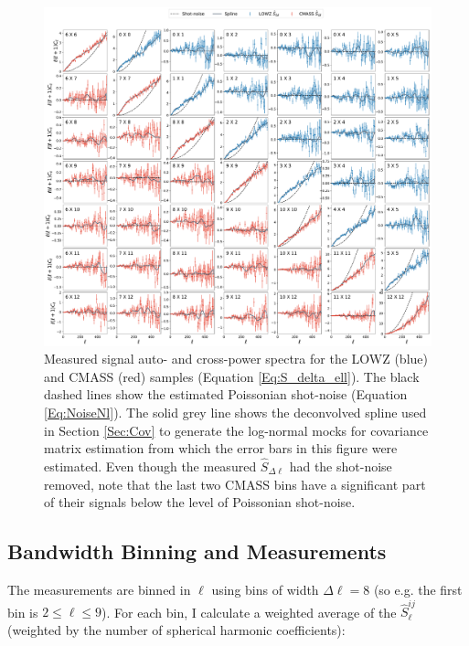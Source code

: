 \begin{figure}
\begin{center}
\includegraphics[width=1.0\textwidth]{BOSS-FIGS/PCL-data_red3.pdf}
\caption[Measured angular power spectra from the BOSS samples.]{Measured signal auto- and cross-power spectra for the LOWZ (blue) and CMASS (red) samples (Equation \ref{Eq:S_delta_ell}). The black dashed lines show the estimated Poissonian shot-noise (Equation \ref{Eq:NoiseNl}). The solid grey line shows the deconvolved spline used in Section \ref{Sec:Cov} to generate the log-normal mocks for covariance matrix estimation from which the error bars in this figure were estimated. Even though the measured $\hat{S}_{\Delta\ell}$ had the shot-noise removed, note that the last two CMASS bins have a significant part of their signals below the level of Poissonian shot-noise.}
\label{fig:PCLs}
\end{center}
\end{figure}

\subsection{Bandwidth Binning and Measurements}

The measurements are binned in $\ell$ using bins of width $\Delta\ell = 8$ (so e.g. the first bin is $2 \leq \ell \leq 9$). For each bin, I calculate a weighted average of the $\hat{S}_{\ell}^{ij}$ (weighted by the number of spherical harmonic coefficients):


